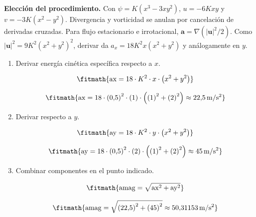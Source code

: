 \noindent\textbf{Elección del procedimiento.} Con $\psi=K(x^3-3xy^2)$, $u=-6Kxy$ y $v=-3K(x^2-y^2)$. Divergencia y vorticidad se anulan por cancelación de derivadas cruzadas. Para flujo estacionario e irrotacional, $\boldsymbol a=\nabla(|\boldsymbol u|^2/2)$. Como $|\boldsymbol u|^2=9K^2(x^2+y^2)^2$, derivar da $a_x=18K^2x(x^2+y^2)$ y análogamente en $y$.

\begin{enumerate}

\item Derivar energía cinética específica respecto a $x$.

\[\fitmath{\mathrm{ax}=18\cdot {K}^{2}\cdot x\cdot \left({x}^{2}+{y}^{2}\right)}\]

\[\fitmath{\mathrm{ax}=18\cdot {(0{,}5)}^{2}\cdot (1)\cdot \left({(1)}^{2}+{(2)}^{2}\right)\approx 22{,}5\,\mathrm{m/s^{2}}}\]

\item Derivar respecto a $y$.

\[\fitmath{\mathrm{ay}=18\cdot {K}^{2}\cdot y\cdot \left({x}^{2}+{y}^{2}\right)}\]

\[\fitmath{\mathrm{ay}=18\cdot {(0{,}5)}^{2}\cdot (2)\cdot \left({(1)}^{2}+{(2)}^{2}\right)\approx 45\,\mathrm{m/s^{2}}}\]

\item Combinar componentes en el punto indicado.

\[\fitmath{\mathrm{amag}=\sqrt{{\mathrm{ax}}^{2}+{\mathrm{ay}}^{2}}}\]

\[\fitmath{\mathrm{amag}=\sqrt{{(22{,}5)}^{2}+{(45)}^{2}}\approx 50{,}31153\,\mathrm{m/s^{2}}}\]

\end{enumerate}
